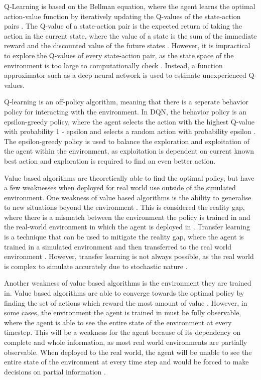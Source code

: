 Q-Learning is based on the Bellman equation, where the agent learns the optimal action-value function by iteratively updating the Q-values of the state-action pairs \cite{mnih2013playing}. The Q-value of a state-action pair is the expected return of taking the action in the current state, where the value of a state is the sum of the immediate reward and the discounted value of the future states \cite{bellman1958dynamic}. However, it is impractical to explore the Q-values of every state-action pair, as the state space of the environment is too large to computationally check \cite{mnih2013playing}. Instead, a function approximator such as a deep neural network is used to estimate unexperienced Q-values. 

Q-learning is an off-policy algorithm, meaning that there is a seperate behavior policy for interacting with the environment. In DQN, the behavior policy is an epsilon-greedy policy, where the agent selects the action with the highest Q-value with probability 1 - epsilon and selects a random action with probability epsilon \cite{TFAgentsAuthors2023}. The epsilon-greedy policy is used to balance the exploration and exploitation of the agent within the environment, as exploitation is dependent on current known best action and exploration is required to find an even better action.

Value based algorithms are theoretically able to find the optimal policy, but have a few weaknesses when deployed for real world use outside of the simulated environment. One weakness of value based algorithms is the ability to generalise to new situations beyond the environment \cite{OdelTruxillo2023}. This is considered the reality gap, where there is a mismatch between the environment the policy is trained in and the real-world environment in which the agent is deployed in \cite{tobin2017domain}. Transfer learning is a technique that can be used to mitigate the reality gap, where the agent is trained in a simulated environment and then transferred to the real world environment \cite{OdelTruxillo2023}. However, transfer learning is not always possible, as the real world is complex to simulate accurately due to stochastic nature \cite{OdelTruxillo2023}. 

Another weakness of value based algorithms is the environment they are trained in. Value based algorithms are able to converge towards the optimal policy by finding the set of actions which reward the most amount of value \cite{OdelTruxillo2023}. However, in some cases, the environment the agent is trained in must be fully observable, where the agent is able to see the entire state of the environment at every timestep. This will be a weakness for the agent because of its dependency on complete and whole information, as most real world environments are partially observable. When deployed to the real world, the agent will be unable to see the entire state of the environment at every time step and would be forced to make decisions on partial information \cite{dulac2021challenges}. 

